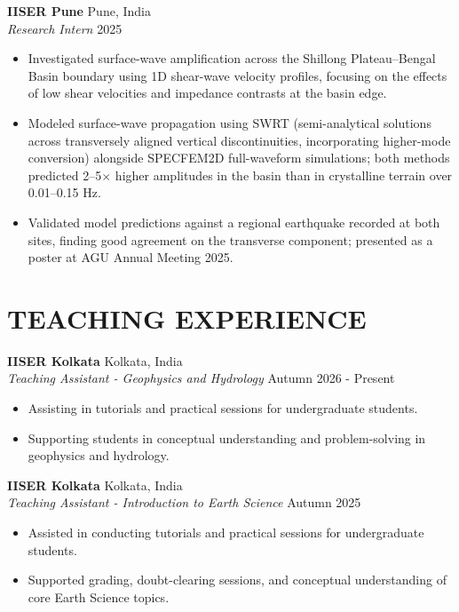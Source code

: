 \documentclass[a4paper,9pt]{extarticle}
\begin{document}
\noindent
\textbf{IISER Pune} \hfill Pune, India\\
\textit{Research Intern} \hfill 2025
\begin{itemize}
    \item Investigated surface-wave amplification across the Shillong Plateau–Bengal Basin boundary using 1D shear-wave velocity profiles, focusing on the effects of low shear velocities and impedance contrasts at the basin edge.
    \item Modeled surface-wave propagation using SWRT (semi-analytical solutions across transversely aligned vertical discontinuities, incorporating higher-mode conversion) alongside SPECFEM2D full-waveform simulations; both methods predicted 2--5$\times$ higher amplitudes in the basin than in crystalline terrain over 0.01--0.15 Hz.
    \item Validated model predictions against a regional earthquake recorded at both sites, finding good agreement on the transverse component; presented as a poster at AGU Annual Meeting 2025.
\end{itemize}

\section*{TEACHING EXPERIENCE}
\noindent
\textbf{IISER Kolkata} \hfill Kolkata, India\\
\textit{Teaching Assistant - Geophysics and Hydrology} \hfill Autumn 2026 - Present
\begin{itemize}
    \item Assisting in tutorials and practical sessions for undergraduate students.
    \item Supporting students in conceptual understanding and problem-solving in geophysics and hydrology.
\end{itemize}

\noindent
\textbf{IISER Kolkata} \hfill Kolkata, India\\
\textit{Teaching Assistant - Introduction to Earth Science} \hfill Autumn 2025
\begin{itemize}
    \item Assisted in conducting tutorials and practical sessions for undergraduate students.
    \item Supported grading, doubt-clearing sessions, and conceptual understanding of core Earth Science topics.
\end{itemize}
\end{document}
